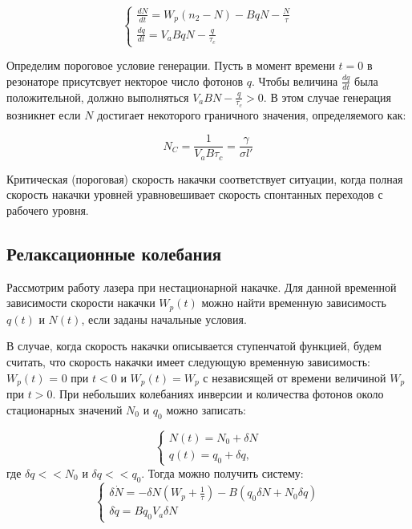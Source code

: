 \documentclass[a4paper]{article}
\begin{document}
\begin{equation*}
\begin{cases}
\frac{dN}{dt} = W_p (n_2 - N) - BqN - \frac{N}{\tau} \\
\frac{dq}{dt} = V_a B q N - \frac{q}{\tau_c}
\end{cases}
\end{equation*}

Определим пороговое условие генерации. Пусть в момент времени $t = 0$ в резонаторе присутсвует некторое число фотонов $q$. Чтобы величина $\frac{dq}{dt}$ была положительной, должно выполняться $V_a BN - \frac{q}{\tau_c} > 0$. В этом случае генерация возникнет если $N$ достигает некоторого граничного значения, определяемого как:

\begin{equation*}
N_C = \frac{1}{V_a B \tau_c} = \frac{\gamma}{\sigma l'}
\end{equation*}

Критическая (пороговая) скорость накачки соответствует ситуации, когда полная скорость накачки уровней уравновешивает скорость спонтанных переходов с рабочего уровня.

\subsection{Релаксационные колебания}

Рассмотрим работу лазера при нестационарной накачке. Для данной временной зависимости скорости накачки $W_p(t)$ можно найти временную зависимость $q(t)$ и $N(t)$, если заданы начальные условия.

В случае, когда скорость накачки описывается ступенчатой функцией, будем считать, что скорость накачки имеет следующую временную зависимость: $W_p(t)$ = 0 при $t<0$ и $W_p(t) = W_p$ с независящей от времени величиной $W_p$ при $t>0$. При небольших колебаниях инверсии и количества фотонов около стационарных значений $N_0$ и $q_0$ можно записать:

\begin{displaymath}
\begin{cases}
N(t) = N_0 + \delta N \\
q(t) = q_0 + \delta q , 
\end{cases}
\end{displaymath}
где $\delta q << N_0$ и $\delta q << q_0$. Тогда можно получить систему:
\begin{displaymath}
\begin{cases}
\delta \dot{N} = - \delta N(W_p + \frac{1}{\tau}) - B(q_0 \delta N + N_0 \delta q) \\
\delta \dot{q} = B q_0 V_a \delta N
\end{cases}
\end{displaymath}
\end{document}
